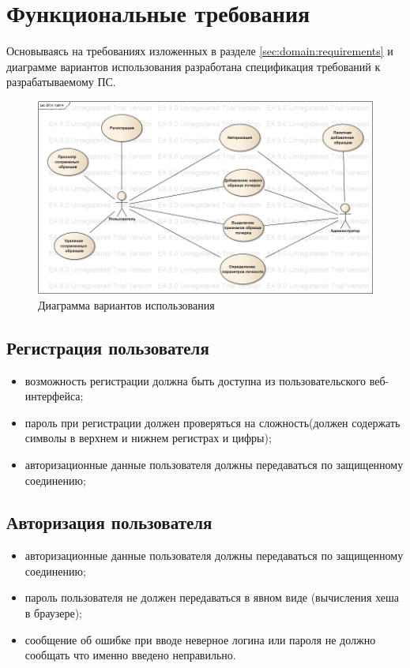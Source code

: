 \section{Функциональные требования}
\label{sec:freq}

Основываясь на требованиях изложенных в разделе \ref{sec:domain:requirements} и диаграмме вариантов использования разработана спецификация требований к разрабатываемому ПС.

\begin{figure}[ht]
\centering
    \includegraphics[scale=0.53]{figures/use_case.png}  
    \caption{Диаграмма вариантов использования}
  \label{fig:freg:usecase}
\end{figure}

\subsection{Регистрация пользователя}
\label{sec:freq:reg}
\begin{itemize}
	\item возможность регистрации должна быть доступна из пользовательского веб-интерфейса;
	\item пароль при регистрации должен проверяться на сложность(должен содержать символы в верхнем и нижнем регистрах и цифры);
	\item авторизационные данные пользователя должны передаваться по защищенному соединению;
\end{itemize}

\subsection{Авторизация пользователя}
\label{sec:freq:auth}
\begin{itemize}
	\item авторизационные данные пользователя должны передаваться по защищенному соединению;
	\item пароль пользователя не должен передаваться в явном виде (вычисления хеша в браузере);
 	\item сообщение об ошибке при вводе неверное логина или пароля не должно сообщать что именно введено неправильно.
\end{itemize}

